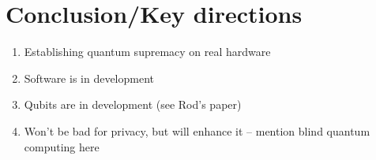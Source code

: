 \documentclass[journal]{IEEEtran}
\begin{document}
\section{Conclusion/Key directions}
\begin{enumerate}
\item    Establishing quantum supremacy on real hardware
\item     Software is in development
\item     Qubits are in development (see Rod's paper)
\item     Won't be bad for privacy, but will enhance it -- mention blind quantum computing here
\end{enumerate}





%
%



%
%
\end{document}
